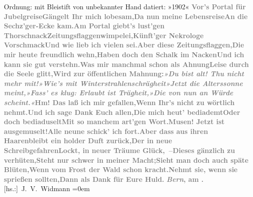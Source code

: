 {\newline{}Ordnung: mit Bleistift von unbekannter Hand datiert: »1902« }\toendnotes[C]{\smallbreak}\stanza{}{\pb}\textcolor{gray}{\textbf{Vor’s Portal für Jubelgreise}}\textcolor{gray}{\textbf{Gängelt Ihr mich lobesam,}}\textcolor{gray}{\textbf{Da nun meine Lebensreise}}\textcolor{gray}{\textbf{An die Sechz’ger-Ecke kam.}}\stanzaend{}\stanza{}\textcolor{gray}{\textbf{Am Portal giebt’s lust’gen Thorschnack}}\textcolor{gray}{\textbf{Zeitungsflaggenwimpelei,}}\textcolor{gray}{\textbf{Künft’ger Nekrologe Vorschmack}}\textcolor{gray}{\textbf{Und wie lieb ich vielen sei.}}\stanzaend{}\stanza{}\textcolor{gray}{\textbf{Aber diese Zeitungsflaggen,}}\textcolor{gray}{\textbf{Die mir heute freundlich wehn,}}\textcolor{gray}{\textbf{Haben doch den Schalk im Nacken}}\textcolor{gray}{\textbf{Und ich kann sie gut verstehn.}}\stanzaend{}\stanza{}\textcolor{gray}{\textbf{Was mir manchmal schon als Ahnung}}\textcolor{gray}{\textbf{Leise durch die Seele glitt,}}\textcolor{gray}{\textbf{Wird zur öffentlichen Mahnung:}}\textcolor{gray}{\textbf{\emph{»Du bist alt! Thu nicht mehr mit!}}}\stanzaend{}\stanza{}\textcolor{gray}{\textbf{\emph{»Wie’s mit Winterstrahlenschrägheit}}}\textcolor{gray}{\textbf{\emph{»Jetzt die Alterssonne meint,}}}\textcolor{gray}{\textbf{\emph{»Fass’ es klug: Erlaubt ist Trägheit,}}}\textcolor{gray}{\textbf{\emph{»Die von nun an Würde scheint.«}}}\stanzaend{}\stanza{}{\pb}\textcolor{gray}{\textbf{Hm! Das laß ich mir gefallen,}}\textcolor{gray}{\textbf{Wenn Ihr’s nicht zu wörtlich nehmt.}}\textcolor{gray}{\textbf{Und ich sage Dank Euch allen,}}\textcolor{gray}{\textbf{Die mich heut’ bediademt}}\stanzaend{}\stanza{}\textcolor{gray}{\textbf{Oder doch bediaduselt}}\textcolor{gray}{\textbf{Mit so manchem art’gen Wort.}}\textcolor{gray}{\textbf{Musen! Jetzt ist ausgemuselt!}}\textcolor{gray}{\textbf{Alle neune schick’ ich fort.}}\stanzaend{}\stanza{}\textcolor{gray}{\textbf{Aber dass aus ihren Haaren}}\textcolor{gray}{\textbf{bleibt ein holder Duft zurück,}}\textcolor{gray}{\textbf{Der in neue Schreibgefahren}}\textcolor{gray}{\textbf{Lockt, in neuer Träume Glück, –}}\stanzaend{}\stanza{}\textcolor{gray}{\textbf{Dieses gänzlich zu verhüten,}}\textcolor{gray}{\textbf{Steht nur schwer in meiner Macht;}}\textcolor{gray}{\textbf{Sieht man doch auch späte Blüten,}}\textcolor{gray}{\textbf{Wenn vom Frost der Wald schon kracht.}}\stanzaend{}\stanza{}\textcolor{gray}{\textbf{Nehmt sie, wenn sie sprießen sollten,}}\textcolor{gray}{\textbf{Dann als Dank für Eure Huld.}}\textcolor{gray}{\textbf{}}\textcolor{gray}{\textbf{}}\stanzaend{}
\pstart
           \textcolor{gray}{\textbf{\emph{Bern}, am \label{K_L01205-1v}\label{K_L01205-1}.}}{\\[\baselineskip]}\spacefill\mbox{{[}hs.:{]} J. V. Widmann}\pend
           \leftskip=0em{}\endnumbering{}  
      